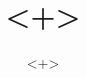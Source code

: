 \documentclass[%
 aip,
 jmp,%
 amsmath,amssymb,
 reprint,%
]{revtex4-1}
\begin{document}
\title{<+>}
\author{<+>}
\maketitle


\end{document}
